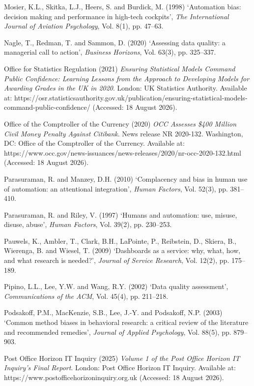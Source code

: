 \documentclass[12pt,a4paper]{article}
\begin{document}
{\rf Mosier, K.L., Skitka, L.J., Heers, S. and Burdick, M. (1998) `Automation bias: decision making and performance in high-tech cockpits', \emph{The International Journal of Aviation Psychology}, Vol. 8(1), pp. 47--63.

\rf Nagle, T., Redman, T. and Sammon, D. (2020) `Assessing data quality: a managerial call to action', \emph{Business Horizons}, Vol. 63(3), pp. 325--337.

\rf Office for Statistics Regulation (2021) \emph{Ensuring Statistical Models Command Public Confidence: Learning Lessons from the Approach to Developing Models for Awarding Grades in the UK in 2020}. London: UK Statistics Authority. Available at: https://osr.statisticsauthority.gov.uk/publication/ensuring-statistical-models-command-public-confidence/ (Accessed: 18 August 2026).

\rf Office of the Comptroller of the Currency (2020) \emph{OCC Assesses \$400 Million Civil Money Penalty Against Citibank}. News release NR 2020-132. Washington, DC: Office of the Comptroller of the Currency. Available at: https://www.occ.gov/news-issuances/news-releases/2020/nr-occ-2020-132.html (Accessed: 18 August 2026).

\rf Parasuraman, R. and Manzey, D.H. (2010) `Complacency and bias in human use of automation: an attentional integration', \emph{Human Factors}, Vol. 52(3), pp. 381--410.

\rf Parasuraman, R. and Riley, V. (1997) `Humans and automation: use, misuse, disuse, abuse', \emph{Human Factors}, Vol. 39(2), pp. 230--253.

\rf Pauwels, K., Ambler, T., Clark, B.H., LaPointe, P., Reibstein, D., Skiera, B., Wierenga, B. and Wiesel, T. (2009) `Dashboards as a service: why, what, how, and what research is needed?', \emph{Journal of Service Research}, Vol. 12(2), pp. 175--189.

\rf Pipino, L.L., Lee, Y.W. and Wang, R.Y. (2002) `Data quality assessment', \emph{Communications of the ACM}, Vol. 45(4), pp. 211--218.

\rf Podsakoff, P.M., MacKenzie, S.B., Lee, J.-Y. and Podsakoff, N.P. (2003) `Common method biases in behavioral research: a critical review of the literature and recommended remedies', \emph{Journal of Applied Psychology}, Vol. 88(5), pp. 879--903.

\rf Post Office Horizon IT Inquiry (2025) \emph{Volume 1 of the Post Office Horizon IT Inquiry's Final Report}. London: Post Office Horizon IT Inquiry. Available at: https://www.postofficehorizoninquiry.org.uk (Accessed: 18 August 2026).

}
\end{document}

